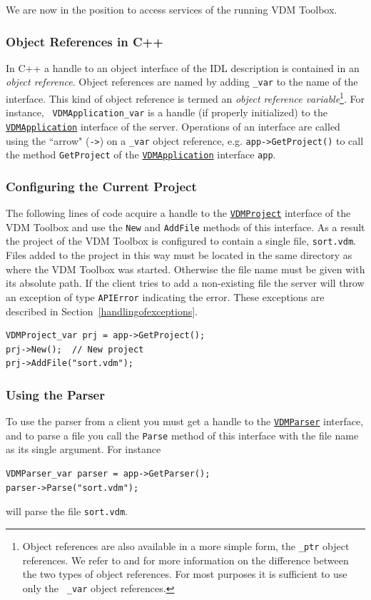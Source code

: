 \documentclass[\pformat,12pt]{article}
\newcommand{\VDMApplication}{\hyperlink{interface.VDMApplication}{VDMApplication}}
\newcommand{\VDMParser}{\hyperlink{interface.VDMParser}{VDMParser}}
\newcommand{\VDMProject}{\hyperlink{interface.VDMProject}{VDMProject}}
\begin{document}
We are now in the position to access services of the running VDM Toolbox.

\subsubsection{Object References in C++}
\label{objectreferences}

In C++ a handle to an object interface of the IDL description is
contained in an {\em object reference}. Object references are named by
adding {\tt \_var} to the name of the interface. This kind of object
reference is termed an {\em object reference variable}\footnote{Object
references are also available in a more simple form, the {\tt \_ptr}
object references. We refer to \cite{omniORB3} and \cite{OMG&96} for
more information on the difference between the two types of object
references. For most purposes it is sufficient to use only the {\tt
\_var} object references.}. For instance, {\tt 
VDMApplication\_var} is a handle (if properly initialized) to the 
{\tt \VDMApplication} interface of the server. Operations of an interface are
called using the ``arrow" ({\tt ->}) on a {\tt \_var} object reference, e.g.
{\tt app->GetProject()} to call the method {\tt GetProject} of the
{\tt \VDMApplication} interface {\tt app}.

\subsubsection{Configuring the Current Project}

The following lines of code acquire a handle to the {\tt \VDMProject}
interface of the VDM Toolbox and use the {\tt New} and {\tt AddFile} methods of
this interface. As a result the project of the VDM Toolbox is
configured to contain a single file, {\tt sort.vdm}. Files added to the
project in this way must be located in the same directory as where the
VDM Toolbox was started. Otherwise the file name must be given with
its absolute path. If the client tries to add a non-existing file the
server will throw an exception of type {\tt APIError} indicating the error.
These exceptions are described in Section~\ref{handlingofexceptions}.

\begin{verbatim}
VDMProject_var prj = app->GetProject();
prj->New();  // New project
prj->AddFile("sort.vdm");
\end{verbatim}

\subsubsection{Using the Parser}
To use the parser from a client you must get a handle to the {\tt \VDMParser}
interface, and to parse a file you call the {\tt Parse} method of this
interface with the file name as its single argument. For instance
\begin{verbatim}
VDMParser_var parser = app->GetParser();
parser->Parse("sort.vdm");
\end{verbatim}
will parse the file {\tt sort.vdm}.
\end{document}
